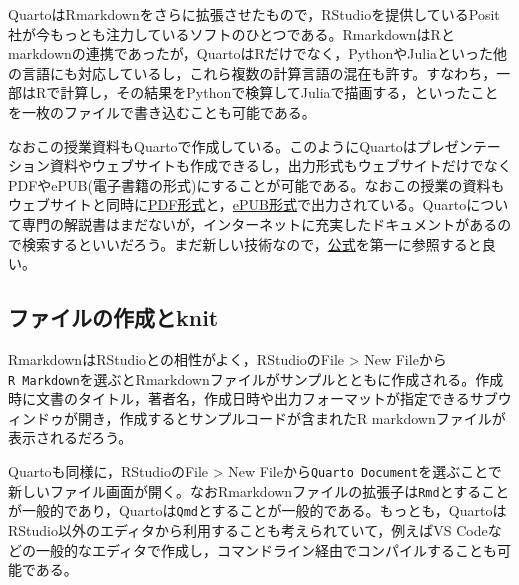 \documentclass[
  a4paper,
]{ltjsbook}
\begin{document}
QuartoはRmarkdownをさらに拡張させたもので，RStudioを提供しているPosit社が今もっとも注力しているソフトのひとつである。RmarkdownはRとmarkdownの連携であったが，QuartoはRだけでなく，PythonやJuliaといった他の言語にも対応しているし，これら複数の計算言語の混在も許す。すなわち，一部はRで計算し，その結果をPythonで検算してJuliaで描画する，といったことを一枚のファイルで書き込むことも可能である。

なおこの授業資料もQuartoで作成している。このようにQuartoはプレゼンテーション資料やウェブサイトも作成できるし，出力形式もウェブサイトだけでなくPDFやePUB(電子書籍の形式)にすることが可能である。なおこの授業の資料もウェブサイトと同時に\href{心理学統計実習.PDF}{PDF形式}と，\href{心理学統計実習.epub}{ePUB形式}で出力されている。Quartoについて専門の解説書はまだないが，インターネットに充実したドキュメントがあるので検索するといいだろう。まだ新しい技術なので，\href{https://quarto.org/}{公式}を第一に参照すると良い。

\subsection{ファイルの作成とknit}\label{ux30d5ux30a1ux30a4ux30ebux306eux4f5cux6210ux3068knit}

RmarkdownはRStudioとの相性がよく，RStudioのFile \textgreater{} New
Fileから\texttt{R\ Markdown}を選ぶとRmarkdownファイルがサンプルとともに作成される。作成時に文書のタイトル，著者名，作成日時や出力フォーマットが指定できるサブウィンドゥが開き，作成するとサンプルコードが含まれたR
markdownファイルが表示されるだろう。

Quartoも同様に，RStudioのFile \textgreater{} New
Fileから\texttt{Quarto\ Document}を選ぶことで新しいファイル画面が開く。なおRmarkdownファイルの拡張子は\texttt{Rmd}とすることが一般的であり，Quartoは\texttt{Qmd}とすることが一般的である。もっとも，QuartoはRStudio以外のエディタから利用することも考えられていて，例えばVS
Codeなどの一般的なエディタで作成し，コマンドライン経由でコンパイルすることも可能である。
\end{document}
